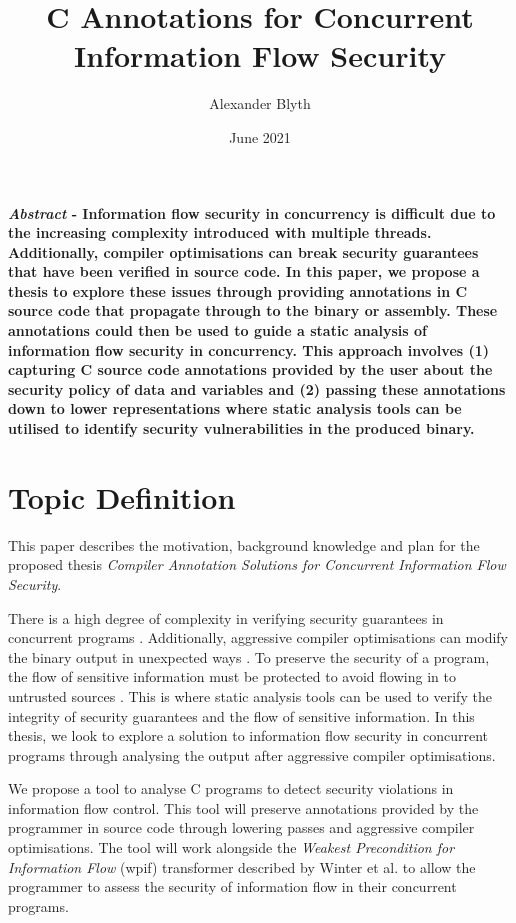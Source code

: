 \documentclass[12pt, a4paper]{report}
\title{C Annotations for Concurrent Information Flow Security}
\author{Alexander Blyth}
\date{June 2021}
\begin{document}
\maketitle

\tableofcontents

\clearpage
\textbf{\textit{Abstract} - Information flow security in concurrency is difficult due to the increasing complexity introduced with multiple threads. Additionally, compiler optimisations can break security guarantees that have been verified in source code. In this paper, we propose a thesis to explore these issues through providing annotations in C source code that propagate through to the binary or assembly. These annotations could then be used to guide a static analysis of information flow security in concurrency. This approach involves (1) capturing C source code annotations provided by the user about the security policy of data and variables and (2) passing these annotations down to lower representations where static analysis tools can be utilised to identify security vulnerabilities in the produced binary. }

\chapter{Topic Definition}
This paper describes the motivation, background knowledge and plan for the proposed thesis \textit{Compiler Annotation Solutions for Concurrent Information Flow Security}.

There is a high degree of complexity in verifying security guarantees in concurrent programs \cite{mantel2014noninterference}\cite{smith2019value}\cite{vaughan2012secure}. Additionally, aggressive compiler optimisations can modify the binary output in unexpected ways \cite{d2015correctness}. To preserve the security of a program, the flow of sensitive information must be protected to avoid flowing in to untrusted sources \cite{balliu2014logics}. This is where static analysis tools can be used to verify the integrity of security guarantees and the flow of sensitive information. In this thesis, we look to explore a solution to information flow security in concurrent programs through analysing the output after aggressive compiler optimisations.

We propose a tool to analyse C programs to detect security violations in information flow control. This tool will preserve annotations provided by the programmer in source code through lowering passes and aggressive compiler optimisations. The tool will work alongside the \textit{Weakest Precondition for Information Flow} (wpif) transformer described by Winter et al. \cite{winter2020information} to allow the programmer to assess the security of information flow in their concurrent programs.
\end{document}
